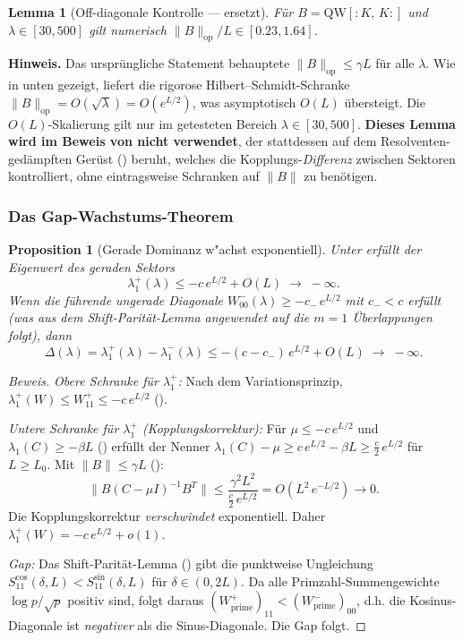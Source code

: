 \documentclass[12pt,a4paper]{article}
\newtheorem{lemma}[theorem]{Lemma}
\newtheorem{proposition}[theorem]{Proposition}
\theoremstyle{definition}
\theoremstyle{remark}
\begin{document}
\begin{lemma}[Off-diagonale Kontrolle --- ersetzt]
\label{lem:L3}
Für $B = \mathrm{QW}[{:}K,\,K{:}]$ und $\lambda \in [30, 500]$ gilt numerisch $\|B\|_{\mathrm{op}}/L \in [0.23, 1.64]$.
\end{lemma}

\noindent\textbf{Hinweis.} Das ursprüngliche Statement behauptete $\|B\|_{\mathrm{op}} \leq \gamma L$ für alle $\lambda$. Wie in  unten gezeigt, liefert die rigorose Hilbert--Schmidt-Schranke $\|B\|_{\mathrm{op}} = O(\sqrt{\lambda}) = O(e^{L/2})$, was asymptotisch $O(L)$ übersteigt. Die $O(L)$-Skalierung gilt nur im getesteten Bereich $\lambda \in [30, 500]$. \textbf{Dieses Lemma wird im Beweis von  nicht verwendet}, der stattdessen auf dem Resolventen-gedämpften Gerüst () beruht, welches die Kopplungs-\emph{Differenz} zwischen Sektoren kontrolliert, ohne eintragsweise Schranken auf $\|B\|$ zu benötigen.

\subsubsection{Das Gap-Wachstums-Theorem}

\begin{proposition}[Gerade Dominanz w"achst exponentiell]
\label{prop:gap-growth}
Unter  erfüllt der Eigenwert des geraden Sektors
\[
  \lambda_1^+(\lambda) \leq -c\,e^{L/2} + O(L) \;\to\; -\infty.
\]
Wenn die führende ungerade Diagonale $W_{00}^-(\lambda) \geq -c_-\,e^{L/2}$ mit $c_- < c$ erfüllt (was aus dem Shift-Parität-Lemma angewendet auf die $m=1$ Überlappungen folgt), dann
\begin{equation}
\label{eq:gap-exp}
  \Delta(\lambda) = \lambda_1^+(\lambda) - \lambda_1^-(\lambda) \leq -(c - c_-)\,e^{L/2} + O(L) \;\to\; -\infty.
\end{equation}
\end{proposition}

\begin{proof}[Beweis]
\emph{Obere Schranke für $\lambda_1^+$:} Nach dem Variationsprinzip, $\lambda_1^+(W) \leq W_{11}^+ \leq -c\,e^{L/2}$ ().

\emph{Untere Schranke für $\lambda_1^+$ (Kopplungskorrektur):} Für $\mu \leq -c\,e^{L/2}$ und $\lambda_1(C) \geq -\beta L$ () erfüllt der Nenner $\lambda_1(C) - \mu \geq c\,e^{L/2} - \beta L \geq \tfrac{c}{2}\,e^{L/2}$ für $L \geq L_0$. Mit $\|B\| \leq \gamma L$ ():
\[
  \|B(C - \mu I)^{-1}B^T\| \leq \frac{\gamma^2 L^2}{\frac{c}{2}\,e^{L/2}} = O(L^2\,e^{-L/2}) \to 0.
\]
Die Kopplungskorrektur \emph{verschwindet} exponentiell. Daher $\lambda_1^+(W) = -c\,e^{L/2} + o(1)$.

\emph{Gap:} Das Shift-Parität-Lemma () gibt die punktweise Ungleichung $S_{11}^{\cos}(\delta, L) < S_{11}^{\sin}(\delta, L)$ für $\delta \in (0, 2L)$. Da alle Primzahl-Summengewichte $\log p / \sqrt{p}$ positiv sind, folgt daraus $(W_{\mathrm{prime}}^+)_{11} < (W_{\mathrm{prime}}^-)_{00}$, d.h. die Kosinus-Diagonale ist \emph{negativer} als die Sinus-Diagonale. Die Gap folgt.
\end{proof}
\end{document}

